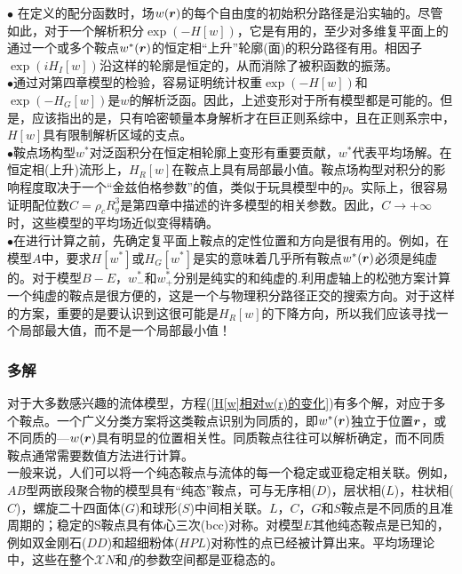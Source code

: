 $\bullet$ 在定义的配分函数时，场$w(\bm{r})$的每个自由度的初始积分路径是沿实轴的。尽管如此，对于一个解析积分$\exp(-H[w])$，它是有用的，至少对多维复平面上的通过一个或多个鞍点$w^*(\bm{r})$的恒定相“上升”轮廓(面)的积分路径有用。相因子$\exp(iH_I[w])$沿这样的轮廓是恒定的，从而消除了被积函数的振荡。\\

 $\bullet$通过对第四章模型的检验，容易证明统计权重$\exp(-H[w])$和$\exp(-H_G[w])$是$w$的解析泛函。因此，上述变形对于所有模型都是可能的。但是，应该指出的是，只有哈密顿量本身解析才在巨正则系综中，且在正则系宗中，$H[w]$具有限制解析区域的支点。\\

$\bullet$鞍点场构型$w^*$对泛函积分在恒定相轮廓上变形有重要贡献，$w^*$代表平均场解。在恒定相(上升)流形上，$H_R[w]$在鞍点上具有局部最小值。鞍点场构型对积分的影响程度取决于一个“金兹伯格参数”的值，类似于玩具模型中的$p$。实际上，很容易证明配位数$C=\rho_cR_g^3$是第四章中描述的许多模型的相关参数。因此，$C\rightarrow +\infty$时，这些模型的平均场近似变得精确。\\

$\bullet$在进行计算之前，先确定复平面上鞍点的定性位置和方向是很有用的。例如，在模型$A$中，要求$H[w^*]$或$H_G[w^*]$是实的意味着几乎所有鞍点$w^*(\bm{r})$必须是纯虚的。对于模型$B-E$，$w_{-}^*$和$w_{+}^{*}$分别是纯实的和纯虚的.利用虚轴上的松弛方案计算一个纯虚的鞍点是很方便的，这是一个与物理积分路径正交的搜索方向。对于这样的方案，重要的是要认识到这很可能是$H_R[w]$的下降方向，所以我们应该寻找一个局部最大值，而不是一个局部最小值！\\
\subsubsection{多解}
对于大多数感兴趣的流体模型，方程(\ref{H[w]相对w(r)的变化})有多个解，对应于多个鞍点。一个广义分类方案将这类鞍点识别为同质的，即$w^*(\bm{r})$独立于位置$\bm{r}$，或不同质的—$w(\bm{r})$具有明显的位置相关性。同质鞍点往往可以解析确定，而不同质鞍点通常需要数值方法进行计算。\\

一般来说，人们可以将一个纯态鞍点与流体的每一个稳定或亚稳定相关联。例如，$AB$型两嵌段聚合物的模型具有“纯态”鞍点，可与无序相($D$)，层状相($L$)，柱状相($C$)，螺旋二十四面体($G$)和球形($S$)中间相关联。$L$，$C$，$G$和$S$鞍点是不同质的且准周期的；稳定的S鞍点具有体心三次(bcc)对称。对模型$E$其他纯态鞍点是已知的，例如双金刚石($DD$)和超细粉体($HPL$)对称性的点已经被计算出来。平均场理论中，这些在整个$\mathcal{X}N$和$f$的参数空间都是亚稳态的。\\

